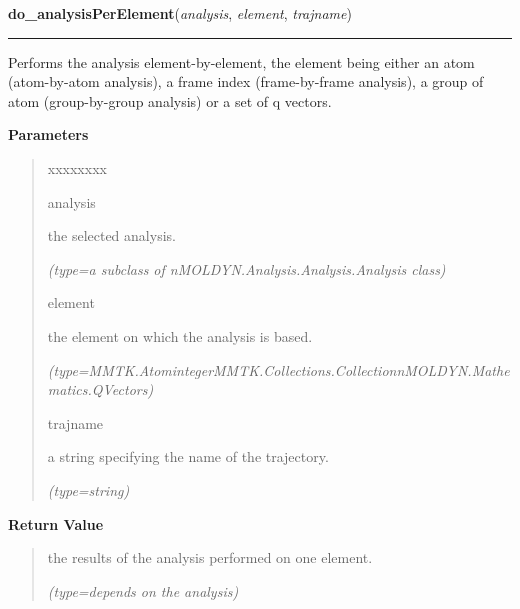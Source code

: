 \hspace{.8\funcindent}\begin{boxedminipage}{\funcwidth}

    \raggedright \textbf{do\_analysisPerElement}(\textit{analysis}, \textit{element}, \textit{trajname})

    \vspace{-1.5ex}

    \rule{\textwidth}{0.5\fboxrule}
\setlength{\parskip}{2ex}
    Performs the analysis element-by-element, the element being either an 
    atom (atom-by-atom analysis), a frame index (frame-by-frame analysis), 
    a group of atom (group-by-group analysis) or a set of q vectors.

\setlength{\parskip}{1ex}
      \textbf{Parameters}
      \vspace{-1ex}

      \begin{quote}
        \begin{Ventry}{xxxxxxxx}

          \item[analysis]

          the selected analysis.

            {\it (type=a subclass of nMOLDYN.Analysis.Analysis.Analysis class)}

          \item[element]

          the element on which the analysis is based.

            {\it (type=MMTK.Atom{\textbar}integer{\textbar}MMTK.Collections.Collection{\textbar}nMOLDYN.Mathematics.QVectors)}

          \item[trajname]

          a string specifying the name of the trajectory.

            {\it (type=string)}

        \end{Ventry}

      \end{quote}

      \textbf{Return Value}
    \vspace{-1ex}

      \begin{quote}
      the results of the analysis performed on one element.

      {\it (type=depends on the analysis)}

      \end{quote}

    \end{boxedminipage}

